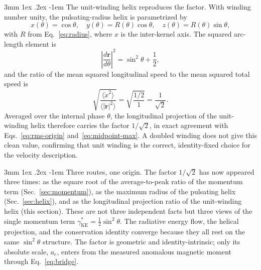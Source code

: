 \documentclass[%
 reprint, amsmath,amssymb, aps, prb, ]{revtex4-2}
\makeatletter
\numberwithin{equation}{section}
\renewcommand\paragraph{%
  \@startsection{paragraph}{4}{\z@}%
    {3mm \@plus 1ex \@minus .2ex}%
    {-1em}%
    {\normalfont\normalsize\itshape}}
\newcommand{\gKE}{\gamma^{*}_{\text{KE}}}
\makeatother
\begin{document}
\paragraph{The unit-winding helix reproduces the factor.}
With winding number unity, the pulsating-radius helix is parametrized by
\begin{equation}
x(\theta)=\cos\theta,\quad y(\theta)=R(\theta)\cos\theta,\quad z(\theta)=R(\theta)\sin\theta,
\label{eq:helix-param}
\end{equation}
with $R$ from Eq.~\eqref{eq:radius}, where $x$ is the inter-kernel axis. The squared arc-length element is
\begin{equation}
\left\lvert\frac{d\mathbf{r}}{d\theta}\right\rvert^2 = \sin^2\theta + \frac{1}{2},
\label{eq:arclength}
\end{equation}
and the ratio of the mean squared longitudinal speed to the mean squared total speed is
\begin{equation}
\sqrt{\frac{\langle \dot{x}^2\rangle}{\langle \lvert\dot{\mathbf{r}}\rvert^2\rangle}} = \sqrt{\frac{1/2}{1}} = \frac{1}{\sqrt{2}}.
\label{eq:projection}
\end{equation}
Averaged over the internal phase $\theta$, the longitudinal projection of the unit-winding helix therefore carries the factor $1/\sqrt{2}$, in exact agreement with Eqs.~\eqref{eq:rms-origin} and~\eqref{eq:midpoint-max}. A doubled winding does not give this clean value, confirming that unit winding is the correct, identity-fixed choice for the velocity description.

\paragraph{Three routes, one origin.}
The factor $1/\sqrt{2}$ has now appeared three times: as the square root of the average-to-peak ratio of the momentum term (Sec.~\ref{sec:momentum}), as the maximum radius of the pulsating helix (Sec.~\ref{sec:helix}), and as the longitudinal projection ratio of the unit-winding helix (this section). These are not three independent facts but three views of the single momentum term $\gKE=\tfrac{1}{2}\sin^2\theta$. The radiative energy flow, the helical projection, and the conservation identity converge because they all rest on the same $\sin^2\theta$ structure. The factor is geometric and identity-intrinsic; only its absolute scale, $a_e$, enters from the measured anomalous magnetic moment through Eq.~\eqref{eq:bridge}.

\end{document}
